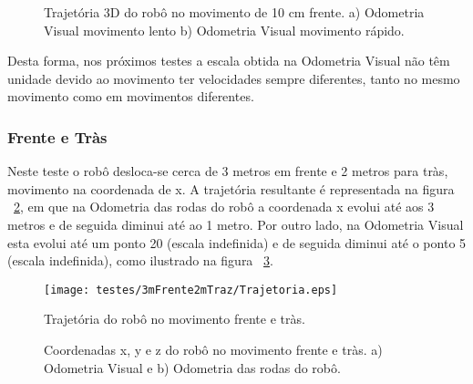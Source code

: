 \begin{figure}[h!]
	\centering
	\qquad
	\caption{Trajetória 3D do robô no movimento de 10 cm frente. a) Odometria Visual movimento lento b) Odometria Visual movimento rápido.}
	\label{fig:traj3D10cm}
\end{figure}




\FloatBarrier
Desta forma, nos próximos testes a escala obtida na Odometria Visual não têm unidade devido ao movimento ter velocidades sempre diferentes, tanto no mesmo movimento como em movimentos diferentes. 



\FloatBarrier
\subsubsection{Frente e Tràs}\label{subsubsection:EmFrenteTraz}

Neste teste o robô desloca-se cerca de 3 metros em frente e 2 metros para tràs, movimento na coordenada de x. A trajetória resultante é representada na figura ~\ref{fig:trajRobo3mFrente2mTraz}, em que na  Odometria das rodas do robô a coordenada x evolui até aos 3 metros e de seguida diminui até ao 1 metro. Por outro lado,  na Odometria Visual esta evolui até um ponto 20 (escala indefinida) e de seguida diminui até o ponto 5 (escala indefinida), como ilustrado na figura ~\ref{fig:pos3mFrente2mTraz}.


\begin{figure}[h!]
	\begin{center}
		\leavevmode		
		\texttt{[image: testes/3mFrente2mTraz/Trajetoria.eps]}
		\caption{Trajetória do robô no movimento frente e tràs.}
		\label{fig:trajRobo3mFrente2mTraz}
	\end{center}
\end{figure}



\begin{figure}[h!]
	\centering
	\qquad
	\caption{Coordenadas x, y e z do robô  no movimento frente e tràs. a) Odometria Visual e b) Odometria das rodas do robô.}
	\label{fig:pos3mFrente2mTraz}
\end{figure}

